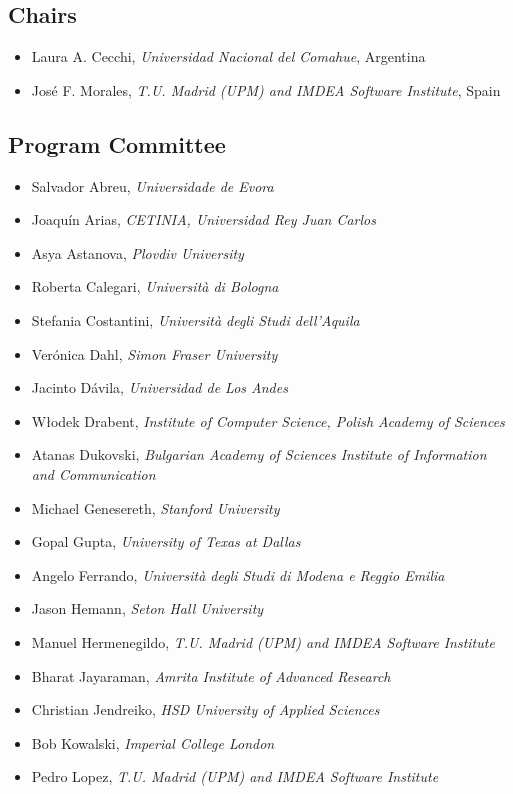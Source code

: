 \documentclass[
]{ceurart}
\begin{document}
\subsection*{Chairs}
\begin{itemize}
  \item Laura A. Cecchi, \emph{Universidad Nacional del Comahue}, Argentina
  \item José F. Morales, \emph{T.U. Madrid (UPM) and IMDEA Software Institute}, Spain
\end{itemize}

\subsection*{Program Committee}
\begin{itemize}
\item Salvador Abreu, \emph{Universidade de Evora}
\item Joaquín Arias, \emph{CETINIA, Universidad Rey Juan Carlos}
\item Asya Astanova, \emph{Plovdiv University}
\item Roberta Calegari, \emph{Università di Bologna}
\item Stefania Costantini, \emph{Università degli Studi dell'Aquila}
\item Verónica Dahl, \emph{Simon Fraser University}
\item Jacinto Dávila, \emph{Universidad de Los Andes}
\item Włodek Drabent, \emph{Institute of Computer Science, Polish Academy of Sciences}
\item Atanas Dukovski, \emph{Bulgarian Academy of Sciences Institute of Information and Communication}
\item Michael Genesereth, \emph{Stanford University}
\item Gopal Gupta, \emph{University of Texas at Dallas}
\item Angelo Ferrando, \emph{Università degli Studi di Modena e Reggio Emilia}
\item Jason Hemann, \emph{Seton Hall University}
\item Manuel Hermenegildo, \emph{T.U. Madrid (UPM) and IMDEA Software Institute}
\item Bharat Jayaraman, \emph{Amrita Institute of Advanced Research}
\item Christian Jendreiko, \emph{HSD University of Applied Sciences}
\item Bob Kowalski, \emph{Imperial College London}
\item Pedro Lopez, \emph{T.U. Madrid (UPM) and IMDEA Software Institute}

\end{itemize}
\end{document}

